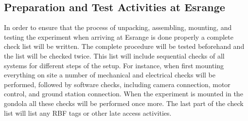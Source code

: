 \subsection{Preparation and Test Activities at Esrange}\label{prep_for_Esrange}
In order to ensure that the process of unpacking, assembling, mounting, and testing the experiment when arriving at Esrange is done properly a complete check list will be written. The complete procedure will be tested beforehand and the list will be checked twice. This list will include sequential checks of all systems for different steps of the setup. For instance, when first mounting everything on site a number of mechanical and electrical checks will be performed, followed by software checks, including camera connection, motor control, and ground station connection. When the experiment is mounted in the gondola all these checks will be performed once more. The last part of the check list will list any RBF tags or other late access activities.
